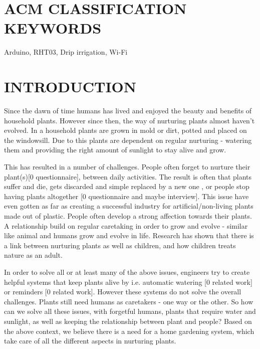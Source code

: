\documentclass{ubicomp2012}
\begin{document}
\section{ACM CLASSIFICATION KEYWORDS}
Arduino, RHT03, Drip irrigation, Wi-Fi

\section{INTRODUCTION}
Since the dawn of time humans has lived and enjoyed the beauty and benefits \cite{The-Benefits-of-Plants-and-Landscaping, houseplants-make-you-smarter, People-Plant-Relationship} of household plants. However since then, the way of nurturing plants almost haven't evolved. In a household plants are grown in mold or dirt, potted and placed on the windowsill. Due to this plants are dependent on regular nurturing - watering them and providing the right amount of sunlight to stay alive and grow.

This has resulted in a number of challenges. People often forget to nurture their plant(s)[0 questionnaire], between daily activities. The result is often that plants suffer and die, gets discarded and simple replaced by a new one \cite{Danes-spend-approx-2000-a-year-on-plants}, or people stop having plants altogether [0 questionnaire and maybe interview]. This issue have even gotten as far as creating a successful industry for artificial/non-living plants made out of plastic.
People often develop a strong affection towards their plants. A relationship build on regular caretaking in order to grow and evolve - similar like animal and humans grow and evolve in life\cite{People-Plant-Relationship}. Research has shown that there is a link between nurturing plants as well as children, and how children treats nature as an adult\cite{Childrens-Active-and-Passive-Interactions-with-Plants}.

In order to solve all or at least many of the above issues, engineers try to create helpful systems that keep plants alive by i.e. automatic watering [0 related work] or reminders [0 related work]. However these systems do not solve the overall challenges. Plants still need humans as caretakers - one way or the other. So how can we solve all these issues, with forgetful humans, plants that require water and sunlight, as well as keeping the relationship between plant and people? Based on the above context, we believe there is a need for a home gardening system, which take care of all the different aspects in nurturing plants.
\end{document}

